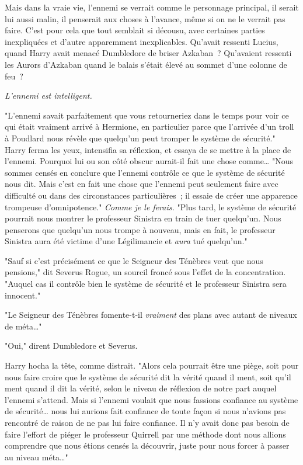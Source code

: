 Mais dans la vraie vie, l'ennemi se verrait comme le personnage principal, il serait lui aussi malin, il penserait aux choses à l'avance, même si on ne le verrait pas faire. C'est pour cela que tout semblait si décousu, avec certaines parties inexpliquées et d'autre apparemment inexplicables. Qu'avait ressenti Lucius, quand Harry avait menacé Dumbledore de briser Azkaban~? Qu'avaient ressenti les Aurors d'Azkaban quand le balais s'était élevé au sommet d'une colonne de feu~?

\emph{L'ennemi est intelligent.}

"L'ennemi savait parfaitement que vous retourneriez dans le temps pour voir ce qui était vraiment arrivé à Hermione, en particulier parce que l'arrivée d'un troll à Poudlard nous révèle que quelqu'un peut tromper le système de sécurité." Harry ferma les yeux, intensifia sa réflexion, et essaya de se mettre à la place de l'ennemi. Pourquoi lui ou son côté obscur aurait-il fait une chose comme… "Nous sommes censés en conclure que l'ennemi contrôle ce que le système de sécurité nous dit. Mais c'est en fait une chose que l'ennemi peut seulement faire avec difficulté ou dans des circonstances particulières~; il essaie de créer une apparence trompeuse d'omnipotence." \emph{Comme je le ferais.} "Plus tard, le système de sécurité pourrait nous montrer le professeur Sinistra en train de tuer quelqu'un. Nous penserons que quelqu'un nous trompe à nouveau, mais en fait, le professeur Sinistra aura été victime d'une Légilimancie et \emph{aura} tué quelqu'un."

"Sauf si c'est précisément ce que le Seigneur des Ténèbres veut que nous pensions," dit Severus Rogue, un sourcil froncé sous l'effet de la concentration. "Auquel cas il contrôle bien le système de sécurité et le professeur Sinistra sera innocent."

"Le Seigneur des Ténèbres fomente-t-il \emph{vraiment} des plans avec autant de niveaux de méta…"

"Oui," dirent Dumbledore et Severus.

Harry hocha la tête, comme distrait. "Alors cela pourrait être une piège, soit pour nous faire croire que le système de sécurité dit la vérité quand il ment, soit qu'il ment quand il dit la vérité, selon le niveau de réflexion de notre part auquel l'ennemi s'attend. Mais si l'ennemi voulait que nous fassions confiance au système de sécurité… nous lui aurions fait confiance de toute façon si nous n'avions pas rencontré de raison de ne pas lui faire confiance. Il n'y avait donc pas besoin de faire l'effort de piéger le professeur Quirrell par une méthode dont nous allions comprendre que nous étions censés la découvrir, juste pour nous forcer à passer au niveau méta…"

